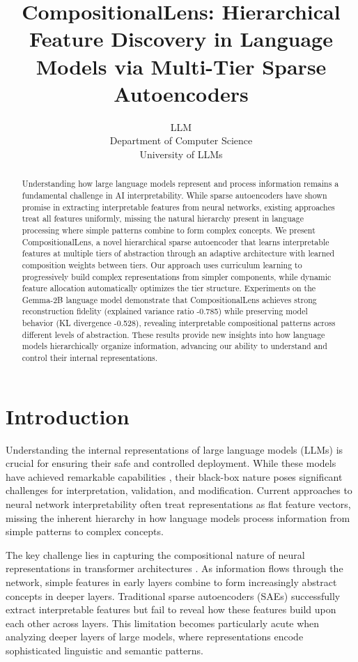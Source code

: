 \documentclass{article} %
\title{CompositionalLens: Hierarchical Feature Discovery in Language Models via Multi-Tier Sparse Autoencoders}
\author{LLM\\
Department of Computer Science\\
University of LLMs\\
}
\begin{document}
\maketitle

\begin{abstract}
Understanding how large language models represent and process information remains a fundamental challenge in AI interpretability. While sparse autoencoders have shown promise in extracting interpretable features from neural networks, existing approaches treat all features uniformly, missing the natural hierarchy present in language processing where simple patterns combine to form complex concepts. We present CompositionalLens, a novel hierarchical sparse autoencoder that learns interpretable features at multiple tiers of abstraction through an adaptive architecture with learned composition weights between tiers. Our approach uses curriculum learning to progressively build complex representations from simpler components, while dynamic feature allocation automatically optimizes the tier structure. Experiments on the Gemma-2B language model demonstrate that CompositionalLens achieves strong reconstruction fidelity (explained variance ratio -0.785) while preserving model behavior (KL divergence -0.528), revealing interpretable compositional patterns across different levels of abstraction. These results provide new insights into how language models hierarchically organize information, advancing our ability to understand and control their internal representations.
\end{abstract}

\section{Introduction}
\label{sec:intro}

Understanding the internal representations of large language models (LLMs) is crucial for ensuring their safe and controlled deployment. While these models have achieved remarkable capabilities \cite{gpt4}, their black-box nature poses significant challenges for interpretation, validation, and modification. Current approaches to neural network interpretability often treat representations as flat feature vectors, missing the inherent hierarchy in how language models process information from simple patterns to complex concepts.

The key challenge lies in capturing the compositional nature of neural representations in transformer architectures \cite{vaswani2017attention}. As information flows through the network, simple features in early layers combine to form increasingly abstract concepts in deeper layers. Traditional sparse autoencoders (SAEs) \cite{goodfellow2016deep} successfully extract interpretable features but fail to reveal how these features build upon each other across layers. This limitation becomes particularly acute when analyzing deeper layers of large models, where representations encode sophisticated linguistic and semantic patterns.
\end{document}
